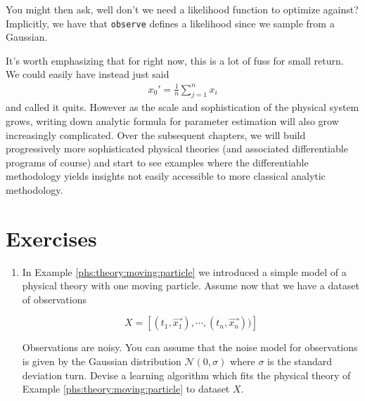 \documentclass[book.tex]{subfiles}
\begin{document}
You might then ask, well don't we need a likelihood function to optimize against? Implicitly, we have that \lstinline{observe} defines a likelihood since we sample from a Gaussian.

It's worth emphasizing that for right now, this is a lot of fuss for small return. We could easily have instead just said
\begin{align}
x_0' = \frac{1}{n} \sum_{j=1}^n x_i
\end{align}
and called it quits. However as the scale and sophistication of the physical system grows, writing down analytic formula for parameter estimation will also grow increasingly complicated. Over the subsequent chapters, we will build progressively more sophisticated physical theories (and associated differentiable programs of course) and start to see examples where the differentiable methodology yields insights not easily accessible to more classical analytic methodology.


\section{Exercises}
\begin{enumerate}
    \item In Example \ref{phs:theory:moving:particle} we introduced a simple model of a physical theory with one moving particle. Assume now that we have a dataset of observations 

\[ X = [(t_1, \vec{x_1}), \cdots, (t_n, \vec{x_n}))] \]

Observations are noisy. You can assume that the noise model for observations is given by the Gaussian distribution $\mathcal{N}(0, \sigma)$ where $\sigma$ is the standard deviation turn. Devise a learning algorithm which fits the physical theory of Example \ref{phs:theory:moving:particle} to dataset $X$.

\end{enumerate}
\end{document}
